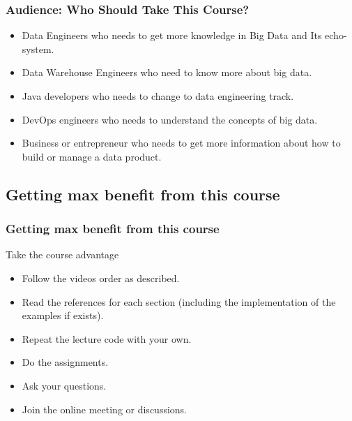 \begin{frame}
\frametitle{Audience: Who Should Take This Course?}

\begin{itemize}
	\item<1-> Data Engineers who needs to get more knowledge in Big Data and Its echo-system. \pause
	\item<2-> Data Warehouse Engineers who need to know more about big data. \pause
	\item<3-> Java developers who needs to change to data engineering track.  \pause
	\item<4-> DevOps engineers who needs to understand the concepts of big data.  \pause
	\item<5-> Business or entrepreneur who needs to get more information about how to build or manage a data product. \pause
\end{itemize}

\end{frame}


\subsection{Getting max benefit from this course}

\begin{frame}
\frametitle{Getting max benefit from this course}
\begin{block}{Take the course advantage}
\begin{itemize}
	\item<1-> Follow the videos order as described. \pause
	\item<2-> Read the references for each section (including the implementation of the examples if exists). \pause
	\item<3-> Repeat the lecture code with your own.  \pause
	\item<4-> Do the assignments.\pause
	\item<5-> Ask your questions. \pause
	\item<6-> Join the online meeting or discussions. \pause
\end{itemize}
\end{block}

\end{frame}


